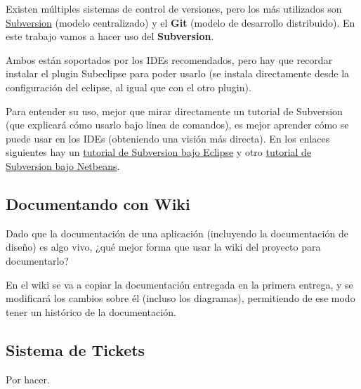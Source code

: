 \documentclass[11pt]{article}
\begin{document}
Existen múltiples sistemas de control de versiones, pero los más utilizados son \href{http://www.subversion.org}{Subversion} (modelo centralizado) 
y el \textbf{Git} (modelo de desarrollo distribuido). En este trabajo vamos a hacer uso del \textbf{Subversion}. 


Ambos están soportados por los IDEs recomendados, pero hay que recordar instalar el plugin Subeclipse para poder usarlo
(se instala directamente desde la configuración del eclipse, al igual que con el otro plugin).


Para entender su uso, mejor que mirar directamente un tutorial de Subversion (que explicará
cómo usarlo bajo linea de comandos), es mejor aprender cómo se puede usar en los IDEs (obteniendo una visión más directa).
En los enlaces siguientes hay un \href{http://www.ibm.com/developerworks/opensource/library/os-ecl-subversion/}{tutorial de Subversion bajo Eclipse} y otro \href{http://netbeans.org/kb/docs/ide/subversion.html}{tutorial de Subversion bajo Netbeans}.
\subsection{Documentando con Wiki}
\label{sec-7-3}




Dado que la documentación de una aplicación (incluyendo la documentación de diseño) es algo vivo, ¿qué mejor forma
que usar la wiki del proyecto para documentarlo?


En el wiki se va a copiar la documentación entregada en la primera entrega, y se modificará los cambios sobre él
(incluso los diagramas), permitiendo de ese modo tener un histórico de la documentación.
\subsection{Sistema de Tickets}
\label{sec-7-4}
\label{tickets}


Por hacer.
\end{document}
